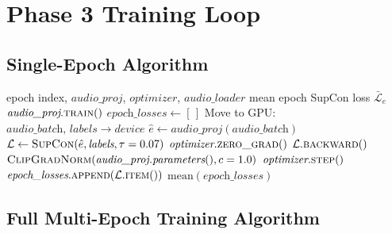\documentclass[12pt,a4paper]{article}
\theoremstyle{definition}
\theoremstyle{remark}
\begin{document}
\section{Phase 3 Training Loop}

\subsection{Single-Epoch Algorithm}

\begin{algorithm}[H]
\caption{Phase 3 Single-Epoch Training (SupCon)}
\label{alg:epoch}
\begin{algorithmic}[1]
\Require epoch index, $\textit{audio\_proj}$, $\textit{optimizer}$, $\textit{audio\_loader}$
\Ensure mean epoch SupCon loss $\bar{\mathcal{L}}_e$
\State $\textit{audio\_proj}.\textsc{train}()$
\State $\textit{epoch\_losses} \gets [\,]$
  \State Move to GPU: $\textit{audio\_batch},\, \textit{labels} \to \textit{device}$
  \State $\hat{e} \gets \textit{audio\_proj}(\textit{audio\_batch})$
  \State $\mathcal{L} \gets \textsc{SupCon}(\hat{e}, \textit{labels}, \tau=0.07)$
  \State $\textit{optimizer}.\textsc{zero\_grad}()$
  \State $\mathcal{L}.\textsc{backward}()$
  \State $\textsc{ClipGradNorm}(\textit{audio\_proj.parameters}(), c=1.0)$
  \State $\textit{optimizer}.\textsc{step}()$
  \State $\textit{epoch\_losses}.\textsc{append}(\mathcal{L}.\textsc{item}())$
\EndFor
\State \Return $\text{mean}(\textit{epoch\_losses})$
\end{algorithmic}
\end{algorithm}

\subsection{Full Multi-Epoch Training Algorithm}
\end{document}
